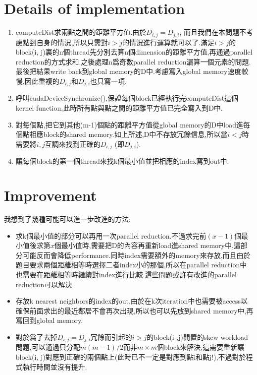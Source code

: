 \documentclass[a4paper]{article}
\begin{document}
\section{Details of implementation}
\begin{enumerate}
  \item computeDist求兩點之間的距離平方值.由於$D_{i,j} = D_{j,i}$, 而且我們在本問題不考慮點到自身的情況,所以只需對$i > j$的情況進行運算就可以了.滿足$i > j$的block(i, j)裏的n個thread先分別去算n個dimension的距離平方值,再通過parallel reduction的方式求和.之後處理n爲奇數parallel reduction漏算一個元素的問題.最後把結果write back到global memory的D中.考慮寫入global memory速度較慢,因此重複的$D_{i,j}$和$D_{j,i}$也只寫一項.
  \item 呼叫cudaDeviceSynchronize(),保證每個block已經執行完computeDist這個kernel function,此時所有點與點之間的距離平方值已完全寫入到D中.
  \item 對每個點,把它到其他(m-1)個點的距離平方值從global memory的D中load進每個點相應block的shared memory.如上所述,D中不存放冗餘信息,所以當$i < j$時需要將$i,j$互調來找到正確的$D_{i, j}$ (即$D_{j, i}$).
  \item 讓每個block的第一個thread來找k個最小值並把相應的index寫到out中.
\end{enumerate}
\section{Improvement}
我想到了幾種可能可以進一步改進的方法:
\begin{itemize}
  \item 求k個最小值的部分可以再用一次parallel reduction.不過求完前$(x-1)$個最小值後求第$x$個最小值時,需要把D的內容再重新load進shared memory中,這部分可能反而會降低performance.同時index需要額外的memory來存放,而且由於題目要求兩個距離相等時選擇二者index小的那個,所以在parallel reduction中也需要在距離相等時繼續對index進行比較.這些問題或許有改進的parallel reduction可以解決.
  \item 存放k nearest neighbors的index的out,由於在k次iteration中也需要被access以確保前面求出的最近鄰居不會再次出現,所以也可以先放到shared memory中,再寫回到global memory.
  \item 對於爲了去掉$D_{i, j} = D_{j, i}$冗餘而引起的$i > j$的block(i ,j)閒置的skew workload問題,可以通過只分配$m(m-1)/2$而非$m \times m$個block來解決,這需要重新讓block(i, j)對應到正確的兩個點上(此時已不一定是對應到點i和點j!),不過對於程式執行時間並沒有提升.
\end{itemize}
\end{document}
